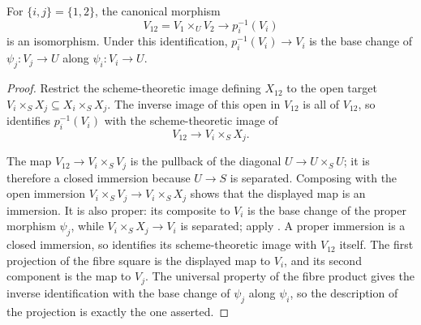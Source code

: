 \begin{lemma}
  \label{lemma:nagata-comparison-restrict-proper-open}
  \leanok

  For \(\{i,j\}=\{1,2\}\), the canonical morphism
  \[
    V_{12}=V_1\times_UV_2\longrightarrow p_i^{-1}(V_i)
  \]
  is an isomorphism.  Under this identification,
  \(p_i^{-1}(V_i)\to V_i\) is the base change of
  \(\psi_j\colon V_j\to U\) along \(\psi_i\colon V_i\to U\).
\end{lemma}

\begin{proof}
  \leanok
  Restrict the scheme-theoretic image defining \(X_{12}\) to the open target
  \(V_i\times_SX_j\subseteq X_i\times_SX_j\).  The inverse image of this
  open in \(V_{12}\) is all of \(V_{12}\), so
   identifies
  \(p_i^{-1}(V_i)\) with the scheme-theoretic image of
  \[
    V_{12}\longrightarrow V_i\times_SX_j.
  \]

  The map \(V_{12}\to V_i\times_SV_j\) is the pullback of the diagonal
  \(U\to U\times_SU\); it is therefore a closed immersion because
  \(U\to S\) is separated.  Composing with the open immersion
  \(V_i\times_SV_j\to V_i\times_SX_j\) shows that the displayed map is an
  immersion.  It is also proper: its composite to \(V_i\) is the base change
  of the proper morphism \(\psi_j\), while
  \(V_i\times_SX_j\to V_i\) is separated; apply
  .  A proper immersion is a
  closed immersion, so
   identifies its
  scheme-theoretic image with \(V_{12}\) itself.
  The first projection of the fibre square is the displayed map to $V_i$,
  and its second component is the map to $V_j$.  The universal property of
  the fibre product gives the inverse identification with the base change of
  $\psi_j$ along $\psi_i$, so the description of the projection is exactly
  the one asserted.
\end{proof}

